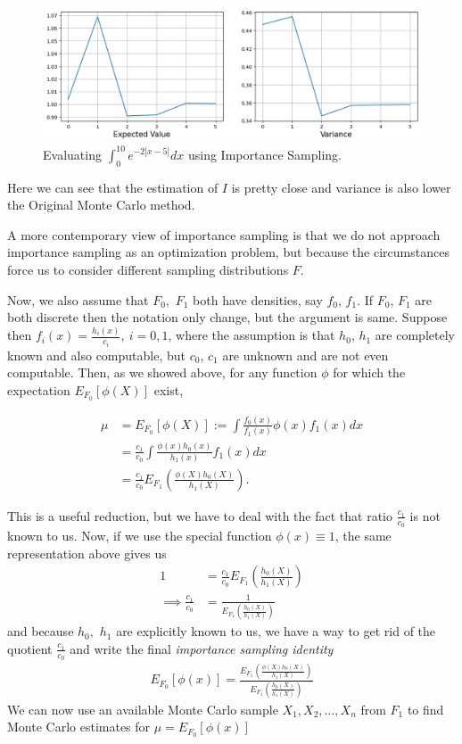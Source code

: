 \begin{example}
	\begin{figure}[H]
		\centering
		\includegraphics[width=1\textwidth]{images/importance-sampling/example1/int_h(x)_ipsam.png}
		\caption{Evaluating $\int_{0}^{10} e^{-2 |x-5|} dx$ using Importance Sampling.}
		\label{fig:impotrancesampling1}
	\end{figure}
	Here we can see that the estimation of $I$ is pretty close and variance is also
	lower the Original Monte Carlo method.
\end{example}

A more contemporary view of importance sampling is that we do not approach
importance sampling as an optimization problem, but because the circumstances
force us to consider different sampling distributions $F$.

Now, we also assume that $F_0,$ $F_1$ both have densities, say $f_0$, $f_1$.
If $F_0$, $F_1$ are both discrete then the notation only change, but the argument is same.
Suppose then $f_i(x)=\frac{h_i(x)}{c_i},\ i=0,1$, where the assumption is that $h_0$, $h_1$
are completely known and also computable, but $c_0$, $c_1$ are unknown and are not even computable.
Then, as we showed above, for any function $\phi$ for which the expectation $E_{F_0}[\phi(X)]$ exist,

\begin{align*}
	\mu & = E_{F_0}[\phi(X)] := \int \frac{f_0(x)}{f_1(x)}\phi(x)f_1(x)dx      \\
	    & =\frac{c_1}{c_0} \int \frac{\phi(x)h_0(x)}{h_1(x)}f_1(x)dx           \\
	    & =\frac{c_1}{c_0} E_{F_1}\left( \frac{\phi(X)h_0(X)}{h_1(X)} \right).
\end{align*}

This is a useful reduction, but we have to deal with the fact that ratio $\frac{c_1}{c_0}$
is not known to us. Now, if we use the special function $\phi(x)\equiv 1$, the same
representation above gives us
\begin{align*}
	1                        & = \frac{c_1}{c_0} E_{F_1} \left( \frac{h_0(X)}{h_1(X)} \right) \\
	\implies \frac{c_1}{c_0} & = \frac{1}{E_{F_1} \left( \frac{h_0(X)}{h_1(X)} \right)}
\end{align*}
and because $h_0,$ $h_1$ are explicitly known to us, we have a way to get rid of the
quotient $\frac{c_1}{c_0}$ and write the final \textit{importance sampling identity}
\begin{align*}
	E_{F_0}[\phi(x)] = \frac{E_{F_1}\left( \frac{\phi(X)h_0(X)}{h_1(X)} \right)}{E_{F_1} \left( \frac{h_0(X)}{h_1(X)} \right)}
\end{align*}
We can now use an available Monte Carlo sample $X_1,X_2,\ldots,X_n$ from $F_1$
to find Monte Carlo estimates for $\mu = E_{F_0}[\phi(x)]$

